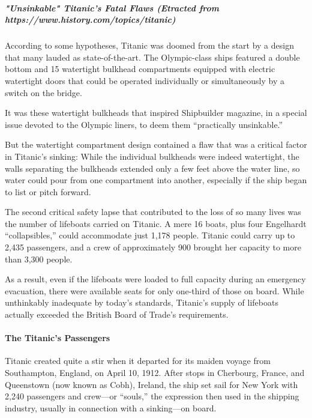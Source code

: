 \documentclass[11pt]{article}
\begin{document}
    
    \subparagraph{"Unsinkable" Titanic's Fatal Flaws (Etracted from
https://www.history.com/topics/titanic)}\label{unsinkable-titanics-fatal-flaws-etracted-from-httpswww.history.comtopicstitanic}

According to some hypotheses, Titanic was doomed from the start by a
design that many lauded as state-of-the-art. The Olympic-class ships
featured a double bottom and 15 watertight bulkhead compartments
equipped with electric watertight doors that could be operated
individually or simultaneously by a switch on the bridge.

It was these watertight bulkheads that inspired Shipbuilder magazine, in
a special issue devoted to the Olympic liners, to deem them
``practically unsinkable.''

But the watertight compartment design contained a flaw that was a
critical factor in Titanic's sinking: While the individual bulkheads
were indeed watertight, the walls separating the bulkheads extended only
a few feet above the water line, so water could pour from one
compartment into another, especially if the ship began to list or pitch
forward.

The second critical safety lapse that contributed to the loss of so many
lives was the number of lifeboats carried on Titanic. A mere 16 boats,
plus four Engelhardt ``collapsibles,'' could accommodate just 1,178
people. Titanic could carry up to 2,435 passengers, and a crew of
approximately 900 brought her capacity to more than 3,300 people.

As a result, even if the lifeboats were loaded to full capacity during
an emergency evacuation, there were available seats for only one-third
of those on board. While unthinkably inadequate by today's standards,
Titanic's supply of lifeboats actually exceeded the British Board of
Trade's requirements.

    \paragraph{The Titanic's Passengers}\label{the-titanics-passengers}

Titanic created quite a stir when it departed for its maiden voyage from
Southampton, England, on April 10, 1912. After stops in Cherbourg,
France, and Queenstown (now known as Cobh), Ireland, the ship set sail
for New York with 2,240 passengers and crew---or ``souls,'' the
expression then used in the shipping industry, usually in connection
with a sinking---on board.
\end{document}
